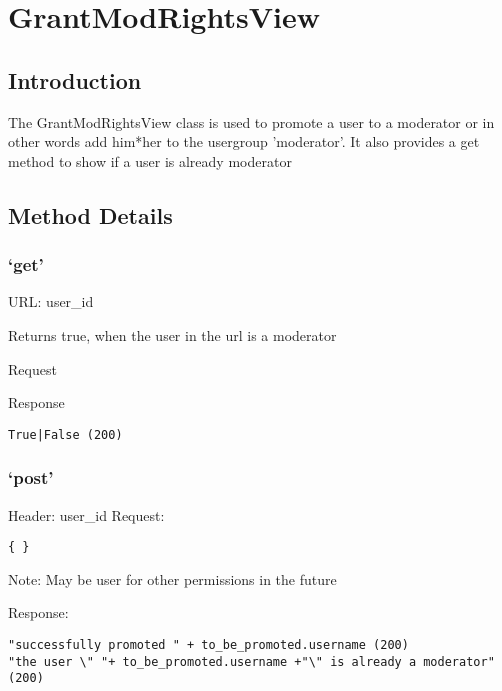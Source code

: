 \chapter*{GrantModRightsView}

\section*{Introduction}\label{introduction}

The GrantModRightsView class is used to promote a user to a moderator or
in other words add him*her to the usergroup 'moderator'. It also
provides a get method to show if a user is already moderator

\section*{Method Details}\label{method-details}

\subsection*{\texorpdfstring{`get'}{get}}\label{get}

URL: user\_id

Returns true, when the user in the url is a moderator

Request

Response

\begin{verbatim}
True|False (200)
\end{verbatim}

\subsection*{\texorpdfstring{`post'}{post}}\label{post}

Header: user\_id Request:

\begin{verbatim}
{ }
\end{verbatim}

Note: May be user for other permissions in the future

Response:

\begin{verbatim}
"successfully promoted " + to_be_promoted.username (200)
"the user \" "+ to_be_promoted.username +"\" is already a moderator" (200)
\end{verbatim}

